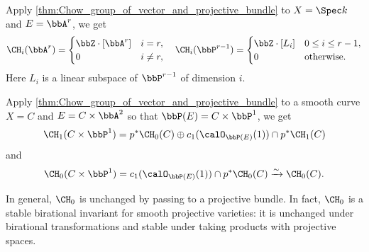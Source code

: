   \begin{example}
    Apply \cref{thm:Chow_group_of_vector_and_projective_bundle} to $X = \Spec k$ and $E = \bbA^r$, we get 
    \[ \CH_i(\bbA^r) = \begin{cases}
        \bbZ \cdot [\bbA^r] & i = r, \\
        0 & i \neq r,
    \end{cases} \quad \CH_i(\bbP^{r-1}) = \begin{cases}
        \bbZ \cdot [L_i] & 0 \leq i \leq r-1, \\
        0 & \text{otherwise}.
    \end{cases} \]
    Here $L_i$ is a linear subspace of $\bbP^{r-1}$ of dimension $i$.
  \end{example}

  \begin{example}
    Apply \cref{thm:Chow_group_of_vector_and_projective_bundle} to a smooth curve $X = C$ and $E = C \times \bbA^2$ so that $\bbP(E) = C \times \bbP^1$, we get
    \[ \CH_1(C \times \bbP^1) = p^*\CH_0(C) \oplus c_1(\calO_{\bbP(E)}(1)) \cap p^*\CH_1(C) \]
    and 
    \[ \CH_0(C \times \bbP^1) = c_1(\calO_{\bbP(E)}(1)) \cap p^*\CH_0(C) \xrightarrow{\sim} \CH_0(C). \]

    In general, $\CH_0$ is unchanged by passing to a projective bundle.
    In fact, $\CH_0$ is a stable birational invariant for smooth projective varieties: it is unchanged under birational transformations and stable under taking products with projective spaces.
  \end{example}

